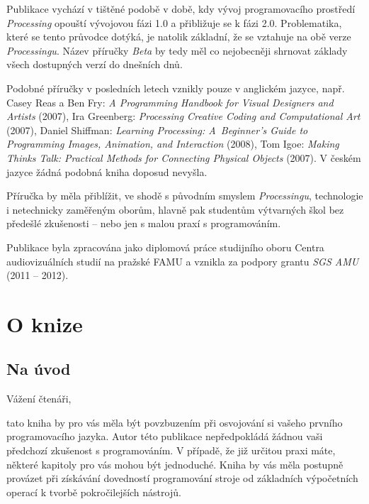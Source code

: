 \documentclass[10pt,twoside=true,open=right,cleardoublepage=empty,chapterprefix=true]{scrbook}
\newcommand{\oddil}[1]{\section{#1}\index{#1}\label{#1}}
\newcommand{\lnb}{\linebreak}
\begin{document}
Publikace vychází v tištěné podobě v době, kdy vývoj programovacího prostředí {\em Processing} opouští vývojovou fázi 1.0 a přibližuje se k fázi 2.0. Problematika, které se tento průvodce dotýká, je natolik základní, že se \lnb vztahuje na obě verze {\em Processingu}. Název příručky {\em Beta} by tedy měl co nejobecněji shrnovat základy všech dostupných verzí do dnešních dnů. 

Podobné příručky v posledních letech vznikly pouze v anglickém jazyce, např. Casey Reas a Ben Fry: {\em A Programming Handbook for Visual Designers and Artists} (2007), Ira Greenberg: {\em Processing Creative Coding and \lnb Computational Art}  (2007), Daniel Shiffman: {\em Learning Processing: A~Be\-ginner's Guide to Programming Images, Animation, and Interaction}  (2008), Tom Igoe: {\em Making Thinks Talk: Practical Methods for Connecting Physical Objects} (2007). V českém jazyce žádná podobná kniha doposud nevyšla.

Příručka by měla přiblížit, ve shodě s původním smyslem {\em Processingu}, technologie i netechnicky zaměřeným oborům, hlavně pak studentům výtvarných škol bez předešlé zkušenosti -- nebo jen s malou praxí s programováním.


Publikace byla zpracována jako diplomová práce studijního oboru \lnb Centra audiovizuálních studií na pražské FAMU a vznikla za podpory \lnb grantu {\em SGS AMU} (2011 -- 2012). 









\tableofcontents\thispagestyle{empty}

\pagestyle{empty}


\vfill
\chapter{O knize}



\vfill
\thispagestyle{empty}



\oddil{Na úvod}

\pagestyle{fancyplain}

Vážení čtenáři,

tato kniha by pro vás měla být povzbuzením při osvojování si vašeho prvního programovacího jazyka. Autor této publikace nepředpokládá žádnou vaši předchozí zkušenost s programováním. V případě, že již určitou praxi máte, některé kapitoly pro vás mohou být jednoduché. Kniha by vás měla postupně provázet při získávání dovedností programování stroje od základních výpočetních operací k tvorbě pokročilejších nástrojů.
\end{document}
